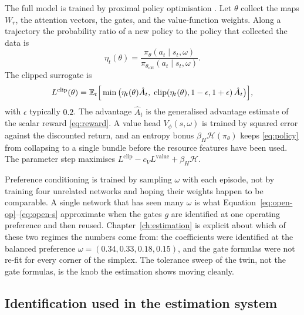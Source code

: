 The full model is trained by proximal policy optimisation \cite{schulman2017}. Let \(\theta\) collect the maps \(W_r\), the attention vectors, the gates, and the value-function weights. Along a trajectory the probability ratio of a new policy to the policy that collected the data is
\begin{equation}
\eta_t(\theta) = \frac{\pi_\theta(a_t \mid s_t, \omega)}{\pi_{\theta_{\mathrm{old}}}(a_t \mid s_t, \omega)} .
\label{eq:ratio}
\end{equation}
The clipped surrogate is
\begin{equation}
L^{\mathrm{clip}}(\theta) = \mathbb{E}_t \Big[ \min\big( \eta_t(\theta) \hat A_t,\; \mathrm{clip}(\eta_t(\theta), 1-\epsilon, 1+\epsilon)\, \hat A_t \big) \Big] ,
\label{eq:ppo}
\end{equation}
with \(\epsilon\) typically \(0.2\). The advantage \(\hat A_t\) is the generalised advantage estimate of the scalar reward \eqref{eq:reward}. A value head \(V_\phi(s,\omega)\) is trained by squared error against the discounted return, and an entropy bonus \(\beta_H \mathcal{H}(\pi_\theta)\) keeps \eqref{eq:policy} from collapsing to a single bundle before the resource features have been used. The parameter step maximises \(L^{\mathrm{clip}} - c_V L^{\mathrm{value}} + \beta_H \mathcal{H}\).

Preference conditioning is trained by sampling \(\omega\) with each episode, not by training four unrelated networks and hoping their weights happen to be comparable. A single network that has seen many \(\omega\) is what Equation~\eqref{eq:open-op}--\eqref{eq:open-s} approximate when the gates \(g\) are identified at one operating preference and then reused. Chapter~\ref{ch:estimation} is explicit about which of these two regimes the numbers come from: the coefficients were identified at the balanced preference \(\omega = (0.34, 0.33, 0.18, 0.15)\), and the gate formulas were not re-fit for every corner of the simplex. The tolerance sweep of the twin, not the gate formulas, is the knob the estimation shows moving cleanly.

\subsection{Identification used in the estimation system}

